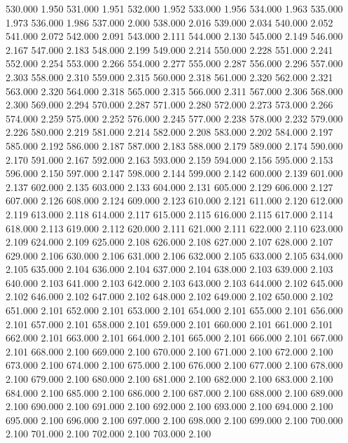 530.000 1.950 
531.000 1.951 
532.000 1.952 
533.000 1.956 
534.000 1.963 
535.000 1.973 
536.000 1.986 
537.000 2.000 
538.000 2.016 
539.000 2.034 
540.000 2.052 
541.000 2.072 
542.000 2.091 
543.000 2.111 
544.000 2.130 
545.000 2.149 
546.000 2.167 
547.000 2.183 
548.000 2.199 
549.000 2.214 
550.000 2.228 
551.000 2.241 
552.000 2.254 
553.000 2.266 
554.000 2.277 
555.000 2.287 
556.000 2.296 
557.000 2.303 
558.000 2.310 
559.000 2.315 
560.000 2.318 
561.000 2.320 
562.000 2.321 
563.000 2.320 
564.000 2.318 
565.000 2.315 
566.000 2.311 
567.000 2.306 
568.000 2.300 
569.000 2.294 
570.000 2.287 
571.000 2.280 
572.000 2.273 
573.000 2.266 
574.000 2.259 
575.000 2.252 
576.000 2.245 
577.000 2.238 
578.000 2.232 
579.000 2.226 
580.000 2.219 
581.000 2.214 
582.000 2.208 
583.000 2.202 
584.000 2.197 
585.000 2.192 
586.000 2.187 
587.000 2.183 
588.000 2.179 
589.000 2.174 
590.000 2.170 
591.000 2.167 
592.000 2.163 
593.000 2.159 
594.000 2.156 
595.000 2.153 
596.000 2.150 
597.000 2.147 
598.000 2.144 
599.000 2.142 
600.000 2.139 
601.000 2.137 
602.000 2.135 
603.000 2.133 
604.000 2.131 
605.000 2.129 
606.000 2.127 
607.000 2.126 
608.000 2.124 
609.000 2.123 
610.000 2.121 
611.000 2.120 
612.000 2.119 
613.000 2.118 
614.000 2.117 
615.000 2.115 
616.000 2.115 
617.000 2.114 
618.000 2.113 
619.000 2.112 
620.000 2.111 
621.000 2.111 
622.000 2.110 
623.000 2.109 
624.000 2.109 
625.000 2.108 
626.000 2.108 
627.000 2.107 
628.000 2.107 
629.000 2.106 
630.000 2.106 
631.000 2.106 
632.000 2.105 
633.000 2.105 
634.000 2.105 
635.000 2.104 
636.000 2.104 
637.000 2.104 
638.000 2.103 
639.000 2.103 
640.000 2.103 
641.000 2.103 
642.000 2.103 
643.000 2.103 
644.000 2.102 
645.000 2.102 
646.000 2.102 
647.000 2.102 
648.000 2.102 
649.000 2.102 
650.000 2.102 
651.000 2.101 
652.000 2.101 
653.000 2.101 
654.000 2.101 
655.000 2.101 
656.000 2.101 
657.000 2.101 
658.000 2.101 
659.000 2.101 
660.000 2.101 
661.000 2.101 
662.000 2.101 
663.000 2.101 
664.000 2.101 
665.000 2.101 
666.000 2.101 
667.000 2.101 
668.000 2.100 
669.000 2.100 
670.000 2.100 
671.000 2.100 
672.000 2.100 
673.000 2.100 
674.000 2.100 
675.000 2.100 
676.000 2.100 
677.000 2.100 
678.000 2.100 
679.000 2.100 
680.000 2.100 
681.000 2.100 
682.000 2.100 
683.000 2.100 
684.000 2.100 
685.000 2.100 
686.000 2.100 
687.000 2.100 
688.000 2.100 
689.000 2.100 
690.000 2.100 
691.000 2.100 
692.000 2.100 
693.000 2.100 
694.000 2.100 
695.000 2.100 
696.000 2.100 
697.000 2.100 
698.000 2.100 
699.000 2.100 
700.000 2.100 
701.000 2.100 
702.000 2.100 
703.000 2.100 
